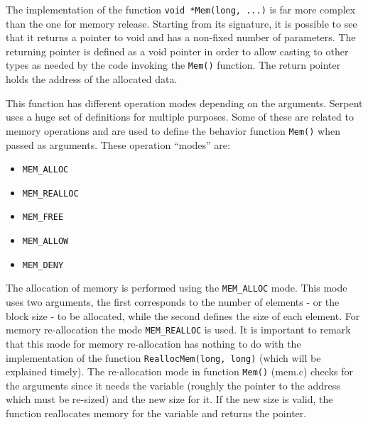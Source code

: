 \documentclass[twoside,a4paper,12pt,english,draft]{anstrans}
\begin{document}
The implementation of the function \texttt{void *Mem(long, ...)} is far more complex than the one for
memory release. Starting from its signature, it is possible to see that it returns a pointer to void
and has a non-fixed number of parameters. The returning pointer is defined as a void pointer in order
to allow casting to other types as needed by the code invoking the \texttt{Mem()}
function. The return pointer holds the address of the allocated data.

This function has different operation modes depending on the arguments. Serpent uses a huge set of definitions for
multiple purposes. Some of these are related to memory operations and are used to define the behavior function \texttt{Mem()}
when passed as arguments. These operation ``modes'' are:


\begin{itemize}
\item \texttt{MEM\_ALLOC}
\item \texttt{MEM\_REALLOC}
\item \texttt{MEM\_FREE}
\item \texttt{MEM\_ALLOW}
\item \texttt{MEM\_DENY}
\end{itemize} 

The allocation of memory is performed using the \texttt{MEM\_ALLOC} mode. This mode uses two arguments, the first
corresponds to the number of elements - or the block size - to be allocated, while the second defines the size of each element.
For memory re-allocation the mode \texttt{MEM\_REALLOC} is used. It is important to remark that this mode for memory re-allocation
has nothing to do with the implementation of the function \texttt{ReallocMem(long, long)} (which will be explained timely). The re-allocation mode
in function \texttt{Mem()} (mem.c) checks for the arguments since it needs the variable (roughly the pointer to the address which must
be re-sized) and the new size for it. If the new size is valid, the function reallocates memory for the variable and returns the pointer.

%
\end{document}
